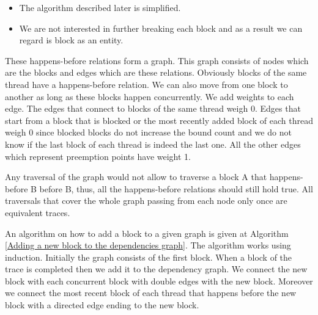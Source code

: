 \begin{itemize}
    \item The algorithm described later is simplified.
    \item We are not interested in further breaking each block and as a result we can regard is block as an entity.
\end{itemize}

These happens-before relations form a graph. This graph consists of nodes which are the blocks and edges which are these
relations. Obviously blocks of the same thread have a happens-before relation. We can also move from one block to another as long as these blocks happen
concurrently. We add weights to each edge. The edges that connect to blocks of the same thread weigh 0. Edges that start from a block that 
is blocked or the most recently added block of each thread weigh 0 since blocked blocks do not increase the bound count and we do not know if the last block of
each thread is indeed the last one. All the other edges which represent preemption points have weight 1.


Any traversal of the graph would not allow to traverse a block A that happens-before B before B, thus, all the happens-before relations should still hold true.
All traversals that cover the whole graph passing from each node only once are equivalent traces.

\noindent An algorithm on how to add a block to a given graph is given at Algorithm \ref{Adding a new block to the dependencies graph}. 
The algorithm works using induction.
Initially the graph consists of the first block. When a block of the trace is completed then we add it to the dependency graph. We connect the new block with each 
concurrent block with double edges with the new block. Moreover we connect the most recent block of each thread that happens before the new block with a directed edge
ending to the new block. 

